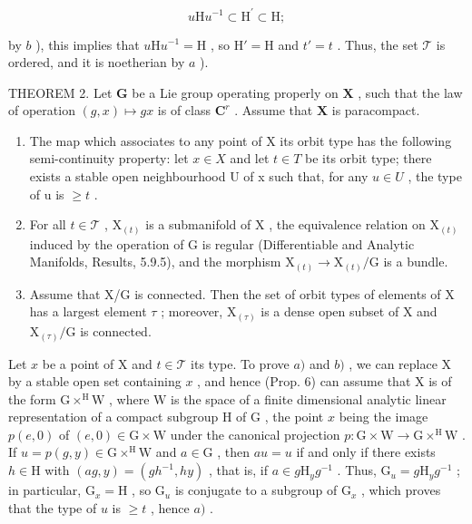 \[
u \mathrm{H} u ^ {- 1} \subset \mathrm{H} ^ {\prime} \subset \mathrm{H};
\]

by \(b\) ), this implies that \(u\mathrm{H}u^{-1} = \mathrm{H}\) , so \(\mathrm{H}' = \mathrm{H}\) and \(t' = t\) . Thus, the set \(\mathcal{T}\) is ordered, and it is noetherian by \(a\) ).

THEOREM 2. Let \(\mathbf{G}\) be a Lie group operating properly on \(\mathbf{X}\) , such that the law of operation \((g,x)\mapsto gx\) is of class \(\mathbf{C}^r\) . Assume that \(\mathbf{X}\) is paracompact.

\begin{enumerate}
\def\labelenumi{\alph{enumi})}
\item
  The map which associates to any point of X its orbit type has the following semi-continuity property: let \(x \in X\) and let \(t \in T\) be its orbit type; there exists a stable open neighbourhood U of x such that, for any \(u \in U\) , the type of u is \(\geq t\) .
\item
  For all \(t \in \mathcal{T}\) , \(\mathrm{X}_{(t)}\) is a submanifold of \(\mathrm{X}\) , the equivalence relation on \(\mathrm{X}_{(t)}\) induced by the operation of \(\mathrm{G}\) is regular (Differentiable and Analytic Manifolds, Results, 5.9.5), and the morphism \(\mathrm{X}_{(t)} \to \mathrm{X}_{(t)} / \mathrm{G}\) is a bundle.
\item
  Assume that X/G is connected. Then the set of orbit types of elements of X has a largest element \(\tau\) ; moreover, \(\mathrm{X}_{(\tau)}\) is a dense open subset of X and \(\mathrm{X}_{(\tau)}/\mathrm{G}\) is connected.
\end{enumerate}

Let \(x\) be a point of \(\mathrm{X}\) and \(t \in \mathcal{T}\) its type. To prove \(a)\) and \(b)\) , we can replace \(\mathrm{X}\) by a stable open set containing \(x\) , and hence (Prop. 6) can assume that \(\mathrm{X}\) is of the form \(\mathrm{G} \times^{\mathrm{H}}\mathrm{W}\) , where \(\mathrm{W}\) is the space of a finite dimensional analytic linear representation of a compact subgroup \(\mathrm{H}\) of \(\mathrm{G}\) , the point \(x\) being the image \(p(e,0)\) of \((e,0) \in \mathrm{G} \times \mathrm{W}\) under the canonical projection \(p: \mathrm{G} \times \mathrm{W} \to \mathrm{G} \times^{\mathrm{H}}\mathrm{W}\) . If \(u = p(g,y) \in \mathrm{G} \times^{\mathrm{H}}\mathrm{W}\) and \(a \in \mathrm{G}\) , then \(au = u\) if and only if there exists \(h \in \mathrm{H}\) with \((ag,y) = (gh^{-1},hy)\) , that is, if \(a \in g\mathrm{H}_yg^{-1}\) . Thus, \(\mathrm{G}_u = g\mathrm{H}_yg^{-1}\) ; in particular, \(\mathrm{G}_x = \mathrm{H}\) , so \(\mathrm{G}_u\) is conjugate to a subgroup of \(\mathrm{G}_x\) , which proves that the type of \(u\) is \(\geq t\) , hence \(a)\) .

